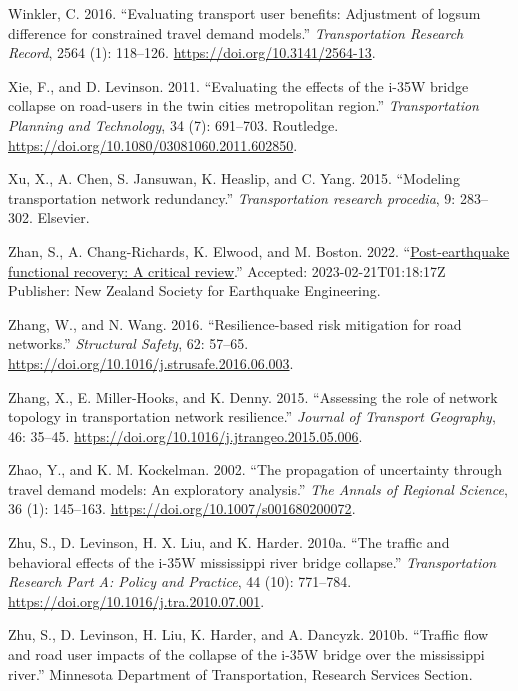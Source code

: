 \documentclass[]{ascelike-new}
\newlength{\cslhangindent}
\newenvironment{CSLReferences}[2] %
 {\begin{list}{}{%
  \setlength{\itemindent}{0pt}
  \setlength{\leftmargin}{0pt}
  \setlength{\parsep}{0pt}
  \ifodd #1
   \setlength{\leftmargin}{\cslhangindent}
   \setlength{\itemindent}{-1\cslhangindent}
  \fi
  \setlength{\itemsep}{#2\baselineskip}}}
 {\end{list}}
\begin{document}
\begin{CSLReferences}{1}{0}
Winkler, C. 2016. {``Evaluating transport user benefits: Adjustment of
logsum difference for constrained travel demand models.''}
\emph{Transportation Research Record}, 2564 (1): 118--126.
\url{https://doi.org/10.3141/2564-13}.

Xie, F., and D. Levinson. 2011. {``Evaluating the effects of the i-35W
bridge collapse on road-users in the twin cities metropolitan region.''}
\emph{Transportation Planning and Technology}, 34 (7): 691--703.
Routledge. \url{https://doi.org/10.1080/03081060.2011.602850}.

Xu, X., A. Chen, S. Jansuwan, K. Heaslip, and C. Yang. 2015. {``Modeling
transportation network redundancy.''} \emph{Transportation research
procedia}, 9: 283--302. Elsevier.

Zhan, S., A. Chang-Richards, K. Elwood, and M. Boston. 2022.
{``\href{https://repo.nzsee.org.nz/xmlui/handle/nzsee/2507}{Post-earthquake
functional recovery: A critical review}.''} Accepted:
2023-02-21T01:18:17Z Publisher: New Zealand Society for Earthquake
Engineering.

Zhang, W., and N. Wang. 2016. {``Resilience-based risk mitigation for
road networks.''} \emph{Structural Safety}, 62: 57--65.
\url{https://doi.org/10.1016/j.strusafe.2016.06.003}.

Zhang, X., E. Miller-Hooks, and K. Denny. 2015. {``Assessing the role of
network topology in transportation network resilience.''} \emph{Journal
of Transport Geography}, 46: 35--45.
\url{https://doi.org/10.1016/j.jtrangeo.2015.05.006}.

Zhao, Y., and K. M. Kockelman. 2002. {``The propagation of uncertainty
through travel demand models: An exploratory analysis.''} \emph{The
Annals of Regional Science}, 36 (1): 145--163.
\url{https://doi.org/10.1007/s001680200072}.

Zhu, S., D. Levinson, H. X. Liu, and K. Harder. 2010a. {``The traffic
and behavioral effects of the i-35W mississippi river bridge
collapse.''} \emph{Transportation Research Part A: Policy and Practice},
44 (10): 771--784. \url{https://doi.org/10.1016/j.tra.2010.07.001}.

Zhu, S., D. Levinson, H. Liu, K. Harder, and A. Dancyzk. 2010b.
{``Traffic flow and road user impacts of the collapse of the i-35W
bridge over the mississippi river.''} Minnesota Department of
Transportation, Research Services Section.

\end{CSLReferences}
\end{document}
